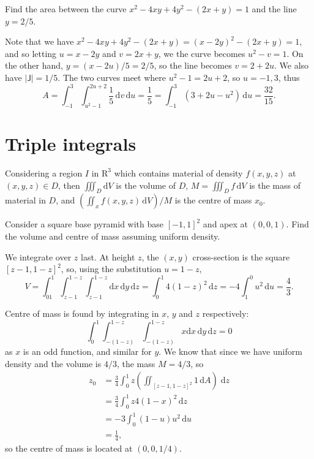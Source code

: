\documentclass[letter-paper]{tufte-book}
\newenvironment{example}[1][Example]{\begin{trivlist}
\item[\hskip \labelsep {\bfseries #1}]}{\end{trivlist}}
\begin{document}
\begin{example}
  Find the area between the curve $x^2 - 4xy + 4y^2 - (2x+y) = 1$ and the line
  $y=2/5$.
  
  Note that we have $x^2 - 4xy + 4y^2 - (2x+y) = (x-2y)^2 - (2x+y) = 1$, and so
  letting $u=x-2y$ and $v=2x+y$, we the curve becomes $u^2-v=1$. On the other
  hand, $y=(x-2u)/5 = 2/5$, so the line becomes $v=2+2u$. We also have
  $|\boldsymbol{\mathsf{J}}|=1/5$. The two curves meet where $u^2-1 = 2u+2$, so
  $u=-1,3$, thus
  \begin{equation*}
    A = \int_{-1}^3 \int_{u^2-1}^{2u+2} \frac{1}{5}\, \mathrm{d}v\, \mathrm{d}u
    = \frac{1}{5} =\int_{-1}^3 (3+2u-u^2)\, \mathrm{d}u = \frac{32}{15}.
  \end{equation*}
\end{example}


\section{Triple integrals}

Considering a region $I$ in $\mathrm{R}^3$ which contains material of density
$f(x,y,z)$ at $(x,y,z) \in D$, then $\iiint_D \mathrm{d}V$ is the volume of $D$,
$M= \iiint_{D} f\, \mathrm{d}V$ is the mass of material in $D$, and $(\iint_x
f(x,y,z)\, \mathrm{d}V)/M$ is the centre of mass $x_0$.

\begin{example}
  Consider a square base pyramid with base $[-1,1]^2$ and apex at $(0,0,1)$.
  Find the volume and centre of mass assuming uniform density.
  
  We integrate over $z$ last. At height $z$, the $(x,y)$ cross-section is the
  square $[z-1, 1-z]^2$, so, using the substitution $u=1-z$,
  \begin{equation*}
    V = \int_01^1 \int_{z-1}^{1-z} \int_{z-1}^{1-z}
    \mathrm{d}x\,\mathrm{d}y\,\mathrm{d}z
    =\int_0^1 4(1-z)^2\, \mathrm{d}z = -4\int_1^0 u^2\,\mathrm{d}u=\frac{4}{3}.
  \end{equation*}
  
  Centre of mass is found by integrating in $x$, $y$ and $z$ respectively:
  \begin{equation*}
    \int_0^1 \int_{-(1-z)}^{1-z} \int_{-(1-z)}^{1-z} x
    \mathrm{d}x\,\mathrm{d}y\,\mathrm{d}z = 0
  \end{equation*}
  as $x$ is an odd function, and similar for $y$. We know that since we have
  uniform density and the volume is $4/3$, the mass $M=4/3$, so
  \begin{align*}
    z_0 &= \frac{3}{4}\int_0^1 z\left(\iint_{[z-1,1-z]^2} 1\,\mathrm{d}A\right)\; \mathrm{d}z \\
      &= \frac{3}{4} \int_0^1 z4(1-x)^2\, \mathrm{d}z \\
      &= -3 \int_0^1 (1-u)u^2\, \mathrm{d}u \\
      &= \frac{1}{4},
  \end{align*}
  so the centre of mass is located at $(0,0,1/4)$.
\end{example}
\end{document}
